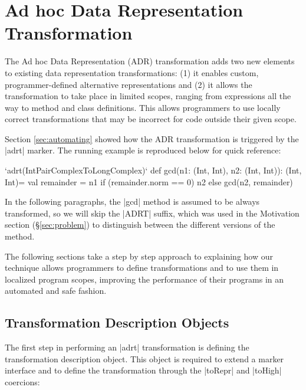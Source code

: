 \section{Ad hoc Data Representation Transformation}
\label{sec:ildl}

The Ad hoc Data Representation (ADR) transformation adds two new elements to existing data representation transformations: (1) it enables custom, programmer-defined alternative representations and (2) it allows the transformation to take place in limited scopes, ranging from expressions all the way to method and class definitions. This allows programmers to use locally correct transformations that may be incorrect for code outside their given scope.

Section \ref{sec:automating} showed how the ADR transformation is triggered by the |adrt| marker. The running example is reproduced below for quick reference:

\begin{lstlisting-nobreak}
`adrt(IntPairComplexToLongComplex)` {
  def gcd(n1: (Int, Int), n2: (Int, Int)): (Int, Int)={
    val remainder = n1 %
    if (remainder.norm == 0) n2 else gcd(n2, remainder)
  }
}
\end{lstlisting-nobreak}

In the following paragraphs, the |gcd| method is assumed to be always transformed, so we will skip the |ADRT| suffix, which was used in the Motivation section (\S\ref{sec:problem}) to distinguish between the different versions of the method.

The following sections take a step by step approach to explaining how our technique allows programmers to define transformations and to use them in localized program scopes,  improving the performance of their programs in an automated and safe fashion.


\subsection{Transformation Description Objects}
\label{sec:ildl:custom}

The first step in performing an |adrt| transformation is defining the transformation description object. This object is required to extend a marker interface and to define the transformation through the |toRepr| and |toHigh| coercions:


